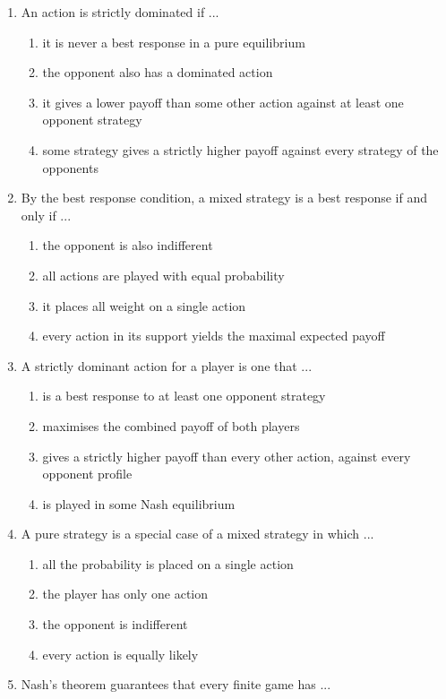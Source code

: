 \documentclass[11pt]{article}
\begin{document}
\begin{enumerate}[itemsep=6pt]
  \item An action is strictly dominated if ...
  \begin{enumerate}
    \item it is never a best response in a pure equilibrium
    \item the opponent also has a dominated action
    \item it gives a lower payoff than some other action against at least one opponent strategy
    \item some strategy gives a strictly higher payoff against every strategy of the opponents
  \end{enumerate}
  \item By the best response condition, a mixed strategy is a best response if and only if ...
  \begin{enumerate}
    \item the opponent is also indifferent
    \item all actions are played with equal probability
    \item it places all weight on a single action
    \item every action in its support yields the maximal expected payoff
  \end{enumerate}
  \item A strictly dominant action for a player is one that ...
  \begin{enumerate}
    \item is a best response to at least one opponent strategy
    \item maximises the combined payoff of both players
    \item gives a strictly higher payoff than every other action, against every opponent profile
    \item is played in some Nash equilibrium
  \end{enumerate}
  \item A pure strategy is a special case of a mixed strategy in which ...
  \begin{enumerate}
    \item all the probability is placed on a single action
    \item the player has only one action
    \item the opponent is indifferent
    \item every action is equally likely
  \end{enumerate}
  \item Nash's theorem guarantees that every finite game has ...

\end{enumerate}
\end{document}
